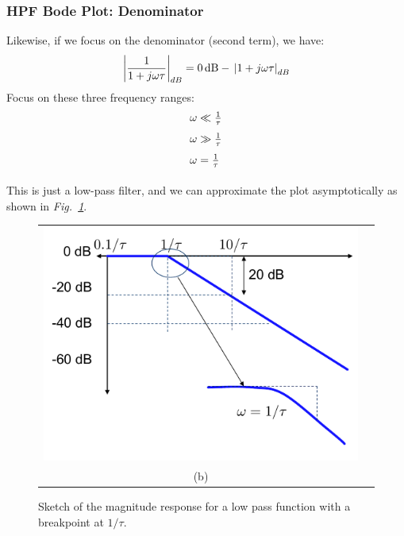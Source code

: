 \subsubsection{HPF Bode Plot: Denominator}
Likewise, if we focus on the denominator (second term), we have:
    \begin{equation} 
        {\left| {\frac{1}{{1 + j\omega \tau }}} \right|_{dB}} = 0\,{\rm{dB}} - \,{\left| {1 + j\omega \tau } \right|_{dB}}
    \end{equation}
Focus on these three frequency ranges:
    \begingroup
    \large
        \begin{equation*}
            \begin{array}{l}
                \vspace{0.25cm}
                \omega \ll \frac{1}{\tau}\\
                \vspace{0.25cm}
                \omega \gg \frac{1}{\tau}\\
                \vspace{0.25cm}
                \omega = \frac{1}{\tau}
            \end{array}
        \end{equation*}
    \endgroup
This is just a low-pass filter, and we can approximate the plot asymptotically as shown in \emph{Fig.~\ref{fig:hpfden}}.
\begin{figure}[H]
\centering
\begin{tabular}{cc}
\includegraphics[width=.50\columnwidth]{mod1_3_10_bode2}\\
(b)\\
\end{tabular}
\caption{Sketch of the magnitude response for a low pass function with a breakpoint at $1/\tau$.}
\label{fig:hpfden}
\end{figure}
\newpage
